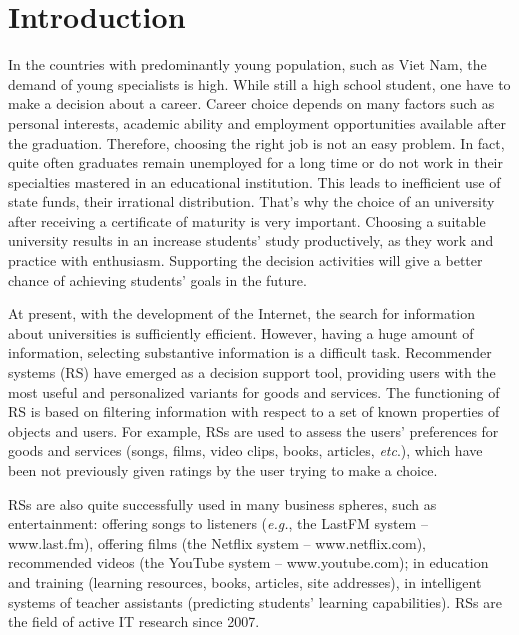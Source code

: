 \documentclass[conference,a4]{IEEEtran}
\begin{document}

\section{Introduction}

In the countries with predominantly young population, such as Viet Nam, the demand of young specialists is high.  While still a high school student, one have to make a decision about a career. Career choice depends on many factors such as personal interests, academic ability and employment opportunities available after the graduation.  Therefore, choosing the right job is not an easy problem.  In fact, quite often graduates remain unemployed for a long time or do not work in their specialties mastered in an educational institution.  This leads to inefficient use of state funds, their irrational distribution.  That's why the choice of an university after receiving a certificate of maturity is very important.  Choosing a suitable university results in an increase students' study productively, as they work and practice with enthusiasm.  Supporting the decision activities will give a better chance of achieving students' goals in the future.


At present, with the development of the Internet, the search for information about universities is sufficiently efficient. However, having a huge amount of information, selecting substantive information is a difficult task.  Recommender systems (RS) have emerged as a decision support tool, providing users with the most useful and personalized variants for goods and services.  The functioning of RS is based on filtering information with respect to a set of known properties of objects and users.  For example, RSs are used to assess the users' preferences for goods and services (songs, films, video clips, books, articles, \emph{etc}.), which have been not previously given ratings by the user trying to make a choice.

RSs are also quite successfully used in many business spheres, such as entertainment: offering songs to listeners (\emph{e.g.}, the LastFM system -- www.last.fm), offering films (the Netflix system -- www.netflix.com), recommended videos (the YouTube system -- www.youtube.com); in education and training (learning resources, books, articles, site addresses), in intelligent systems of teacher assistants (predicting students' learning capabilities).  RSs are the field of active IT research since 2007.
\end{document}
